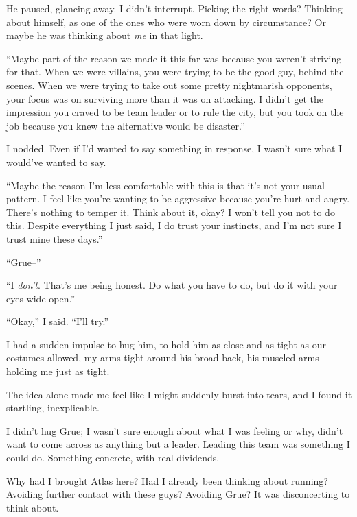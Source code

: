 He paused, glancing away.  I didn't interrupt.  Picking the right words?  Thinking about himself, as one of the ones who were worn down by circumstance?  Or maybe he was thinking about \emph{me} in that light.



``Maybe part of the reason we made it this far was because you weren't striving for that.  When we were villains, you were trying to be the good guy, behind the scenes.  When we were trying to take out some pretty nightmarish opponents, your focus was on surviving more than it was on attacking.  I didn't get the impression you craved to be team leader or to rule the city, but you took on the job because you knew the alternative would be disaster.''



I nodded.  Even if I'd wanted to say something in response, I wasn't sure what I would've wanted to say.



``Maybe the reason I'm less comfortable with this is that it's not your usual pattern.  I feel like you're wanting to be aggressive because you're hurt and angry.  There's nothing to temper it.  Think about it, okay?  I won't tell you not to do this.  Despite everything I just said, I do trust your instincts, and I'm not sure I trust mine these days.''



``Grue--''



``I \emph{don't}.  That's me being honest.  Do what you have to do, but do it with your eyes wide open.''



``Okay,'' I said.  ``I'll try.''



I had a sudden impulse to hug him, to hold him as close and as tight as our costumes allowed, my arms tight around his broad back, his muscled arms holding me just as tight.



The idea alone made me feel like I might suddenly burst into tears, and I found it startling, inexplicable.



I didn't hug Grue; I wasn't sure enough about what I was feeling or why, didn't want to come across as anything but a leader.  Leading this team was something I could do.  Something concrete, with real dividends.



Why had I brought Atlas here?  Had I already been thinking about running?  Avoiding further contact with these guys?  Avoiding Grue?  It was disconcerting to think about.



